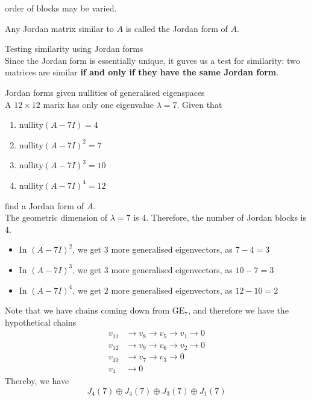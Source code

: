 \documentclass[journal, letterpaper]{IEEEtran}
\begin{document}
    order of blocks may be varied.
    \begin{center}
        Any Jordan matrix similar to $A$ is called the Jordan form of $A$.
    \end{center}
    \begin{myboxr}{Testing similarity using Jordan forms} \\
        Since the Jordan form is essentially unique, it guves us a test for similarity: two matrices are similar \textbf{if and only if they have the same Jordan form}.
    \end{myboxr}
    \begin{myboxg}{Jordan forms given nullities of generalised eigenspaces} \\
        A $12 \times 12$ marix has only one eigenvalue $\lambda = 7$. Given that
        \begin{enumerate}
            \item $\text{nullity}(A - 7I) = 4$
            \item $\text{nullity}(A - 7I)^2 = 7$
            \item $\text{nullity}(A - 7I)^3 = 10$
            \item $\text{nullity}(A - 7I)^4 = 12$
        \end{enumerate}
        find a Jordan form of $A$.
        \newline \\
        The geometric dimension of $\lambda = 7$ is 4. Therefore, the number of Jordan blocks is 4.
        \begin{itemize}
            \item In $(A - 7I)^2$, we get $3$ more generalised eigenvectors, as $7 - 4 = 3$
            \item In $(A - 7I)^3$, we get $3$ more generalised eigenvectors, as $10 - 7 = 3$
            \item In $(A - 7I)^4$, we get $2$ more generalised eigenvectors, as $12 - 10 = 2$
        \end{itemize}
        Note that we have chains coming down from $\text{GE}_7$, and therefore we have the
        hypothetical chains
        \begin{align*}
            v_{11} &\to v_8 \to v_5 \to v_1 \to 0 \\
            v_{12} &\to v_9 \to v_6 \to v_2 \to 0 \\
            v_{10} &\to v_7 \to v_3 \to 0 \\
            v_4 &\to 0
        \end{align*}
        Thereby, we have
        $$ J_4(7) \oplus J_4(7) \oplus J_3(7) \oplus J_1(7)$$
    \end{myboxg}
\end{document}
